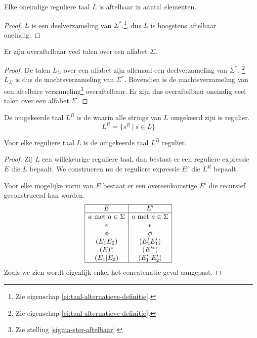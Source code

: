 \documentclass[main.tex]{subfiles}
\begin{document}
\begin{st}
  Elke oneindige reguliere taal $L$ is aftelbaar in aantal elementen.

  \begin{proof}
    $L$ is een deelverzameling van $\Sigma^{*}$.\footnote{Zie eigenschap \ref{ei:taal-alternatieve-definitie}.}, dus $L$ is hoogstens aftelbaar oneindig.
  \end{proof}
\end{st}

\begin{st}
  Er zijn overaftelbaar veel talen over een alfabet $\Sigma$.

  \begin{proof}
    De talen $L_{\Sigma}$ over een alfabet zijn allemaal een deelverzameling van $\Sigma^{*}$. \footnote{Zie eigenschap \ref{ei:taal-alternatieve-definitie}.} $L_{\Sigma}$ is dus de machtsverzameling van $\Sigma^{*}$.
    Bovendien is de machtsverzameling van een aftelbare verzameling\footnote{Zie stelling \ref{sigma-ster-aftelbaar}.} overaftelbaar.
    Er zijn dus overaftelbaar oneindig veel talen over een alfabet $\Sigma$.
  \end{proof}
\end{st}

\begin{de}
  De omgekeerde taal $L^{R}$ is de waarin alle strings van $L$ omgekeerd zijn is regulier.
  \[ L^{R} = \{ s^{R}\ |\ s \in L \} \]
\end{de}

\begin{st}
  \label{omgekeerde-reguliere-taal-is-regulier}
  Voor elke reguliere taal $L$ is de omgekeerde taal $L^{R}$ regulier.

  \begin{proof}
    Zij $L$ een willekeurige reguliere taal, dan bestaat er een reguliere expressie $E$ die $L$ bepaalt.
    We construeren nu de reguliere expressie $E'$ die $L^{R}$ bepaalt.
    
    Voor elke mogelijke vorm van $E$ bestaat er een overeenkomstige $E'$ die recursief geconstrueerd kan worden.
    \[
    \begin{array}{|c|c|}
      \hline
      E                           & E'\\
      \hline
      a \text{ met } a \in \Sigma & a \text{ met } a \in \Sigma\\
      \epsilon                    & \epsilon\\
      \phi                        & \phi\\
      (E_1E_2)                    & (E_{2}'E_{1}')\\
      (E)^{*}                      & (E'^{*})\\
      (E_1|E_2)                   & (E_1'|E_2')\\
      \hline
    \end{array}
    \]
    Zoals we zien wordt eigenlijk enkel het concatenatie geval aangepast. 
  \end{proof}
\end{st}
\end{document}
